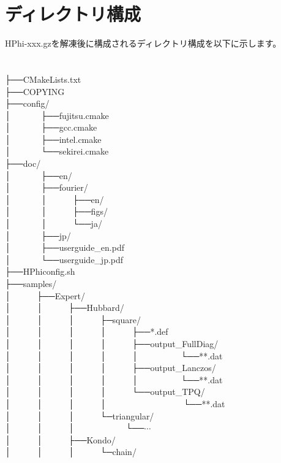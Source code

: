 \section{ディレクトリ構成}
HPhi-xxx.gzを解凍後に構成されるディレクトリ構成を以下に示します。\\
\\
\\
├──CMakeLists.txt\\
├──COPYING\\
├──config/\\
│~~~~~~~├──fujitsu.cmake\\
│~~~~~~~├──gcc.cmake\\
│~~~~~~~├──intel.cmake\\
│~~~~~~~└──sekirei.cmake\\
├──doc/\\
│~~~~~~~├──en/\\
│~~~~~~~├──fourier/\\
│~~~~~~~│~~~~~~├──en/\\
│~~~~~~~│~~~~~~├──figs/\\
│~~~~~~~│~~~~~~└──ja/\\
│~~~~~~~├──jp/\\
│~~~~~~~├──userguide\_en.pdf\\
│~~~~~~~└──userguide\_jp.pdf\\
├──HPhiconfig.sh\\
├──samples/\\
│~~~~~~├──Expert/\\
│~~~~~~│~~~~~~├──Hubbard/\\
│~~~~~~│~~~~~~│~~~~~~├─square/\\
│~~~~~~│~~~~~~│~~~~~~│~~~~~~├──*.def\\
│~~~~~~│~~~~~~│~~~~~~│~~~~~~├──output\_FullDiag/\\
│~~~~~~│~~~~~~│~~~~~~│~~~~~~│~~~~~~~~~~└──**.dat\\
│~~~~~~│~~~~~~│~~~~~~│~~~~~~├──output\_Lanczos/\\
│~~~~~~│~~~~~~│~~~~~~│~~~~~~│~~~~~~~~~~└──**.dat\\
│~~~~~~│~~~~~~│~~~~~~│~~~~~~└──output\_TPQ/\\
│~~~~~~│~~~~~~│~~~~~~│~~~~~~~~~~~~~~~~~~└──**.dat\\
│~~~~~~│~~~~~~│~~~~~~└─triangular/\\
│~~~~~~│~~~~~~│~~~~~~~~~~~~└──$\cdots$\\
│~~~~~~│~~~~~~├──Kondo/\\
│~~~~~~│~~~~~~│~~~~~~└─chain/\\

